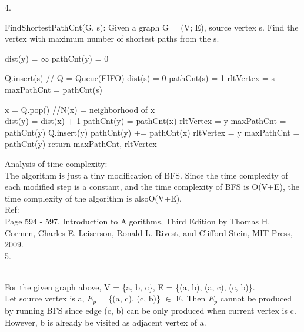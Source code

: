 \documentclass{article}
\begin{document}
4.\\
\begin{algorithm}[H]
	\caption{\newline FindShortestPathCnt(G, s): Given a graph G = (V; E), source vertex s. Find the vertex with maximum number of shortest paths from the s.}
	{
		dist(y) = $\infty$\;
		pathCnt(y) = 0\;
	}
	
	Q.insert(s) // Q = Queue(FIFO)\;
	dist(s) = 0\;
	pathCnt(s) = 1\;
	rltVertex = s\;
	maxPathCnt = pathCnt(s)\;
	
	{
		x = Q.pop()\;
		//N(x) = neighborhood of x\\
		{
			{
				dist(y) = dist(x) + 1\;
				pathCnt(y) = pathCnt(x)\;
				{
					rltVertex = y\;
					maxPathCnt = pathCnt(y)\;
				}
				Q.insert(y)\;
			}
			{
				{
					pathCnt(y) += pathCnt(x)\;
					{
						rltVertex = y\;
						maxPathCnt = pathCnt(y)\;
					}
				}
			}
		}
      }
      return maxPathCnt, rltVertex
\end{algorithm}
Analysis of time complexity:\\
The algorithm is just a tiny modification of BFS. Since the time complexity of each modified step is a constant, and 
the time complexity of BFS is O(V+E), the time complexity of the algorithm is alsoO(V+E).\\

Ref:\\
Page 594 - 597, Introduction to Algorithms, Third Edition by Thomas H. Cormen, Charles
E. Leiserson, Ronald L. Rivest, and Clifford Stein, MIT Press, 2009.\\

5.\\
\\
For the given graph above, V = \{a, b, c\}, E = \{(a, b), (a, c), (c, b)\}.\\
Let source vertex is a, $E_p$ = \{(a, c), (c, b)\} $\in$ E. Then $E_p$ cannot be produced by running BFS since edge 
(c, b) can be only produced when current vertex is c. However, b is already be visited as adjacent vertex of a. \\
\end{document}
